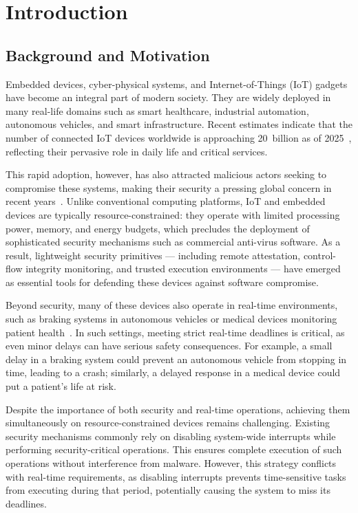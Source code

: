 \documentclass[a4paper,10pt]{article}
\begin{document}
\section{Introduction}

\subsection{Background and Motivation}

Embedded devices, cyber-physical systems, and Internet-of-Things (IoT)
gadgets have become an integral part of modern society. They are widely
deployed in many real-life domains such as smart healthcare, industrial
automation, autonomous vehicles, and smart infrastructure. Recent
estimates indicate that the number of connected IoT devices worldwide
is approaching 20~billion as of 2025~\cite{statista2025iot}, reflecting
their pervasive role in daily life and critical services.

This rapid adoption, however, has also attracted malicious actors seeking
to compromise these systems, making their security a pressing global
concern in recent years~\cite{abera2016things}. Unlike conventional
computing platforms, IoT and embedded devices are typically
resource-constrained: they operate with limited processing power, memory,
and energy budgets, which precludes the deployment of sophisticated
security mechanisms such as commercial anti-virus software. As a result,
lightweight security primitives — including remote attestation,
control-flow integrity monitoring, and trusted execution environments —
have emerged as essential tools for defending these devices against
software compromise.


Beyond security, many of these devices also operate in real-time environments, such as braking systems in autonomous vehicles or medical devices monitoring patient health~\cite{abera2016things}. In such settings, meeting strict real-time deadlines is critical, as even minor delays can have serious safety consequences. For example, a small delay in a braking system could prevent an autonomous vehicle from stopping in time, leading to a crash; similarly, a delayed response in a medical device could put a patient's life at risk.

Despite the importance of both security and real-time operations, achieving them simultaneously on resource-constrained devices remains challenging. Existing security mechanisms commonly rely on disabling system-wide interrupts while performing security-critical operations. This ensures complete execution of such operations without interference from malware. However, this strategy conflicts with real-time requirements, as disabling interrupts prevents time-sensitive tasks from executing during that period, potentially causing the system to miss its deadlines.
\end{document}
